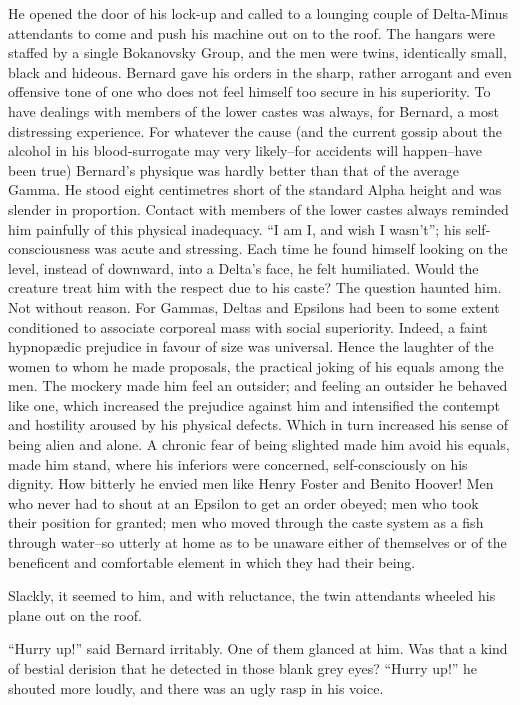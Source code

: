 \documentclass[12pt]{report}
\begin{document}
He opened the door of his lock-up and called to a lounging couple of
Delta-Minus attendants to come and push his machine out on to the roof.
The hangars were staffed by a single Bokanovsky Group, and the men were
twins, identically small, black and hideous. Bernard gave his orders in
the sharp, rather arrogant and even offensive tone of one who does not
feel himself too secure in his superiority. To have dealings with
members of the lower castes was always, for Bernard, a most distressing
experience. For whatever the cause (and the current gossip about the
alcohol in his blood-surrogate may very likely--for accidents will
happen--have been true) Bernard's physique was hardly better than that
of the average Gamma. He stood eight centimetres short of the standard
Alpha height and was slender in proportion. Contact with members of the
lower castes always reminded him painfully of this physical inadequacy.
``I am I, and wish I wasn't''; his self-consciousness was acute and
stressing. Each time he found himself looking on the level, instead of
downward, into a Delta's face, he felt humiliated. Would the creature
treat him with the respect due to his caste? The question haunted him.
Not without reason. For Gammas, Deltas and Epsilons had been to some
extent conditioned to associate corporeal mass with social superiority.
Indeed, a faint hypnopædic prejudice in favour of size was universal.
Hence the laughter of the women to whom he made proposals, the practical
joking of his equals among the men. The mockery made him feel an
outsider; and feeling an outsider he behaved like one, which increased
the prejudice against him and intensified the contempt and hostility
aroused by his physical defects. Which in turn increased his sense of
being alien and alone. A chronic fear of being slighted made him avoid
his equals, made him stand, where his inferiors were concerned,
self-consciously on his dignity. How bitterly he envied men like Henry
Foster and Benito Hoover! Men who never had to shout at an Epsilon to
get an order obeyed; men who took their position for granted; men who
moved through the caste system as a fish through water--so utterly at
home as to be unaware either of themselves or of the beneficent and
comfortable element in which they had their being.

Slackly, it seemed to him, and with reluctance, the twin attendants
wheeled his plane out on the roof.

``Hurry up!'' said Bernard irritably. One of them glanced at him. Was
that a kind of bestial derision that he detected in those blank grey
eyes? ``Hurry up!'' he shouted more loudly, and there was an ugly rasp
in his voice.
\end{document}
